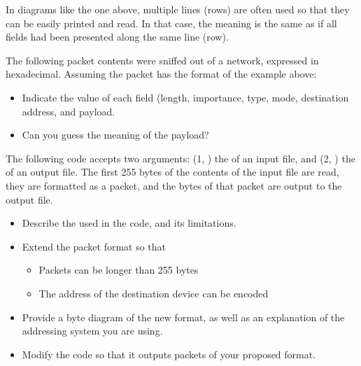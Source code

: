 \begin{remark}
In diagrams like the one above, multiple lines (rows) are often used so that they can be
easily printed and read. In that case, the meaning is the same as if all fields had been
presented along the same line (row).
\end{remark}

\begin{exercise}
The following packet contents were sniffed out of a network,
expressed in hexadecimal. Assuming the packet has the format of the example above:
% 
\begin{itemize}
\item Indicate the value of each field (length, importance, type, mode, destination address, and payload.
\item Can you guess the meaning of the payload?
\end{itemize}
% 
\begin{center}
\end{center}
\end{exercise}

\begin{exercise}
The following code accepts two arguments: (1, ) the  of an input file, 
and (2, ) the  of an output file.
The first 255 bytes of the contents of the input file are read, 
they are formatted as a packet, and the bytes of that packet
are output to the output file.

\begin{center}
\end{center}

\begin{itemize}
\item Describe the  used in the code, and its limitations.

\item Extend the packet format so that 
 \begin{itemize}
   \item Packets can be longer than 255 bytes
   \item The address of the destination device can be encoded
  \end{itemize}
  
\item Provide a byte diagram of the new format, 
as well as an explanation of the addressing system you are using.

\item Modify the code so that it outputs packets of your proposed format.
\end{itemize}
\end{exercise}

